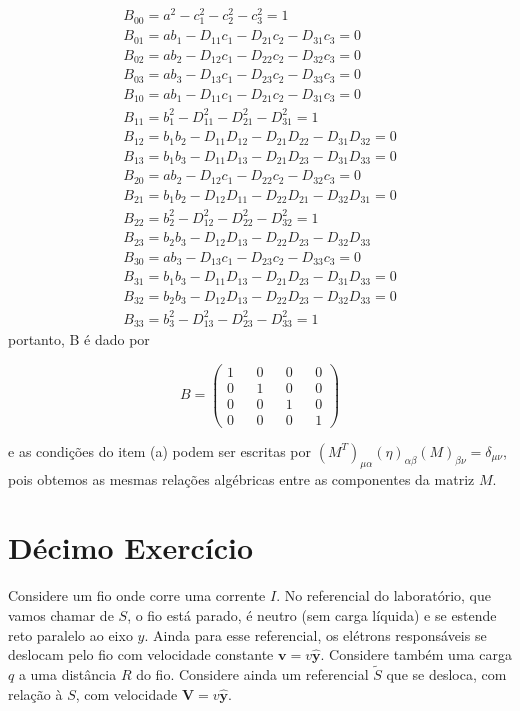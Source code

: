 \documentclass[10pt,a4paper]{article}
\begin{document}
\begin{eqnarray}
	B_{00} = a^2 -c_1^2 - c_2^2 - c_3^2 =1\nonumber\\
	B_{01} = ab_1 - D_{11}c_1 - D_{21}c_2 - D_{31}c_3=0 \nonumber\\
	B_{02} = ab_2 - D_{12}c_1 - D_{22}c_2 - D_{32}c_3=0 \nonumber\\
	B_{03} = ab_3 - D_{13}c_1 - D_{23}c_2 - D_{33}c_3=0 \nonumber\\
	B_{10} = ab_1 - D_{11}c_1 - D_{21}c_2 - D_{31}c_3=0 \nonumber\\
	B_{11} = b_1^2 - D_{11}^2 - D_{21}^2 - D_{31}^2=1 \nonumber\\
	B_{12} = b_1b_2 - D_{11}D_{12} - D_{21}D_{22} - D_{31}D_{32} =0\nonumber\\
	B_{13} = b_1b_3 - D_{11}D_{13} - D_{21}D_{23} - D_{31}D_{33}=0 \nonumber\\
	B_{20} = ab_2 - D_{12}c_1 - D_{22}c_2 - D_{32}c_3=0 \nonumber\\
	B_{21} = b_1b_2 - D_{12}D_{11} - D_{22}D_{21} - D_{32}D_{31}=0 \nonumber\\
	B_{22} = b_2^2 - D_{12}^2 - D_{22}^2 - D_{32}^2=1 \nonumber\\
	B_{23} = b_2b_3 - D_{12}D_{13} - D_{22}D_{23} - D_{32}D_{33} \nonumber\\
	B_{30} = ab_3 - D_{13}c_1 - D_{23}c_2 - D_{33}c_3 =0\nonumber\\
	B_{31} = b_1b_3 - D_{11}D_{13} - D_{21}D_{23} - D_{31}D_{33} =0\nonumber\\
	B_{32} = b_2b_3 - D_{12}D_{13} - D_{22}D_{23} - D_{32}D_{33}=0 \nonumber\\
	B_{33} = b_3^2 - D_{13}^2 - D_{23}^2 - D_{33}^2 =1 \nonumber
\end{eqnarray}
portanto, B é dado por

$$B = \left(\begin{matrix}
	1&&0&&0&&0\\
	0&&1&&0&&0\\
	0&&0&&1&&0\\
	0&&0&&0&&1
\end{matrix}\right)$$

e as condições do item (a) podem ser escritas por $ (M^T)_{\mu\alpha} (\eta)_{\alpha\beta} (M)_{\beta\nu }= \delta_{\mu\nu} $, pois obtemos as mesmas relações algébricas entre as componentes da matriz $ M $.

 
 \section{Décimo Exercício}
Considere um fio onde corre uma corrente $I$. No referencial do laboratório, que vamos chamar de $S$, o fio está parado, é neutro (sem carga líquida) e se estende reto paralelo ao eixo $y$. Ainda para esse referencial, os elétrons responsáveis se deslocam pelo fio com velocidade constante $\mathbf{v}=v\mathbf{\hat{y}}$. Considere também uma carga $q$ a uma distância $R$ do fio. Considere ainda um referencial $\tilde{S}$ que se desloca, com relação à $S$, com velocidade $\mathbf{V}=v\mathbf{\hat{y}}$.
\end{document}
